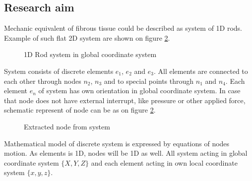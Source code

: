\subsection*{Research aim}
Mechanic equivalent of fibrous tissue could be described as system of 1D rods.
Example of such flat 2D system are shown on figure \ref{fig:nodeExtract}.
\begin{figure}[H]
  \centering
      
  \caption{1D Rod system in global coordinate system}\label{fig:rodSystem}      
\end{figure} 
System consists of discrete elements $e_1$, $e_2$ and $e_3$. All elements are
connected to each other through nodes $n_2$, $n_3$ and to special points through
$n_1$ and $n_4$. Each element $e_n$ of system has own orientation in global
coordinate system. 
In case that node does not have external interrupt, like pressure or other
 applied force, schematic represent of node can be as on figure
 \ref{fig:nodeExtract}.\par
\begin{figure}[H]
  \centering
      
  \caption{Extracted node from system}\label{fig:nodeExtract}
\end{figure}
Mathematical model of discrete system is expressed by equations of nodes motion.
As elements is 1D, nodes will be 1D as well. All system acting in global
coordinate system $\{X, Y, Z\}$ and each element acting in own local coordinate
system $\{x,y,z\}$.